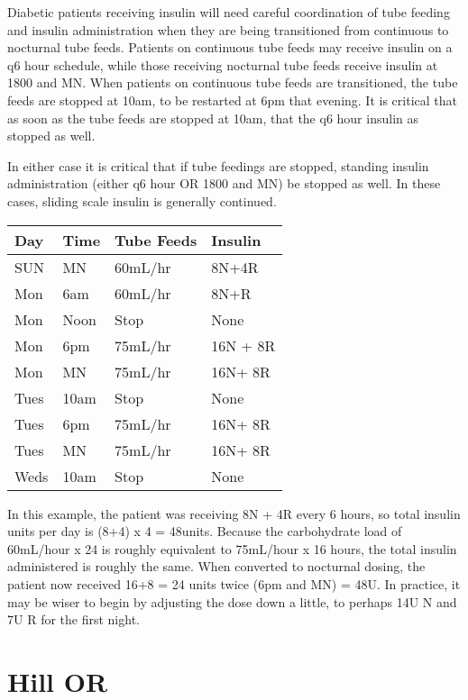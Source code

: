 \documentclass[
]{book}
\begin{document}
Diabetic patients receiving insulin will need careful coordination of tube feeding and insulin administration when they are being transitioned from continuous to nocturnal tube feeds. Patients on continuous tube feeds may receive insulin on a q6 hour schedule, while those receiving nocturnal tube feeds receive insulin at 1800 and MN. When patients on continuous tube feeds are transitioned, the tube feeds are stopped at 10am, to be restarted at 6pm that evening. It is critical that as soon as the tube feeds are stopped at 10am, that the q6 hour insulin as stopped as well.

In either case it is critical that if tube feedings are stopped, standing insulin administration (either q6 hour OR 1800 and MN) be stopped as well. In these cases, sliding scale insulin is generally continued.

\begin{longtable}[]{@{}llll@{}}
\toprule
Day & Time & Tube Feeds & Insulin \\
\midrule
\endhead
SUN & MN & 60mL/hr & 8N+4R \\
Mon & 6am & 60mL/hr & 8N+R \\
Mon & Noon & Stop & None \\
Mon & 6pm & 75mL/hr & 16N + 8R \\
Mon & MN & 75mL/hr & 16N+ 8R \\
Tues & 10am & Stop & None \\
Tues & 6pm & 75mL/hr & 16N+ 8R \\
Tues & MN & 75mL/hr & 16N+ 8R \\
Weds & 10am & Stop & None \\
\bottomrule
\end{longtable}

In this example, the patient was receiving 8N + 4R every 6 hours, so total insulin units per day is (8+4) x 4 = 48units. Because the carbohydrate load of 60mL/hour x 24 is roughly equivalent to 75mL/hour x 16 hours, the total insulin administered is roughly the same. When converted to nocturnal dosing, the patient now received 16+8 = 24 units twice (6pm and MN) = 48U. In practice, it may be wiser to begin by adjusting the dose down a little, to perhaps 14U N and 7U R for the first night.

\hypertarget{part-hill-or}{%
\part*{Hill OR}\label{part-hill-or}}
\end{document}
